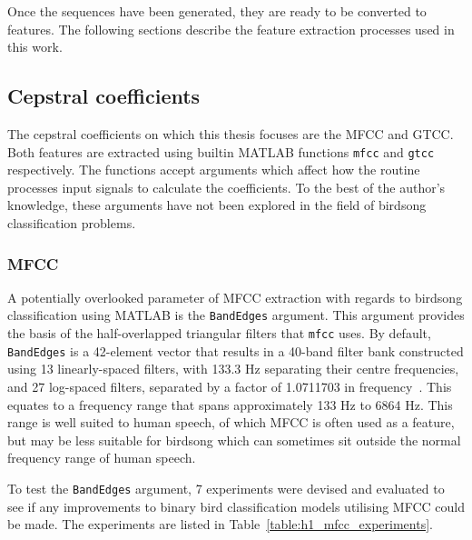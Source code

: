 Once the sequences have been generated, they are ready to be converted to
features. The following sections describe the feature extraction processes used
in this work.

\subsection{Cepstral coefficients}

The cepstral coefficients on which this thesis focuses are the MFCC and GTCC\@.
Both features are extracted using builtin MATLAB functions \texttt{mfcc} and
\texttt{gtcc} respectively. The functions accept arguments which affect how the
routine processes input signals to calculate the coefficients. To the best of
the author's knowledge, these arguments have not been explored in the field of
birdsong classification problems.

\subsubsection{MFCC}\label{sssec:mfcc}

A potentially overlooked parameter of MFCC extraction with regards to birdsong
classification using MATLAB is the \texttt{BandEdges} argument. This
argument provides the basis of the half-overlapped triangular filters that
\texttt{mfcc} uses. By default, \texttt{BandEdges} is a 42-element vector that
results in a 40-band filter bank constructed using 13 linearly-spaced filters,
with 133.3 Hz separating their centre frequencies, and 27 log-spaced filters,
separated by a factor of 1.0711703 in frequency~\cite{slaney1998auditory}. This
equates to a frequency range that spans approximately 133 Hz to 6864 Hz. This
range is well suited to human speech, of which MFCC is often used as a feature,
but may be less suitable for birdsong which can sometimes sit outside the normal
frequency range of human speech.

To test the \texttt{BandEdges} argument, 7 experiments were devised and
evaluated to see if any improvements to binary bird classification
models utilising MFCC could be made. The experiments are listed in
Table~\ref{table:h1_mfcc_experiments}.

